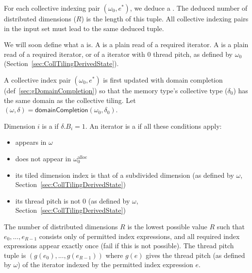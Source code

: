
For each collective indexing pair $(\omega_0, e^*)$, we deduce a .
The deduced number of distributed dimensions ($R$) is the length of this tuple.
All collective indexing pairs in the input set must lead to the same deduced tuple.

We will soon define what a  is.
A  is a plain read of a required iterator.
A  is a plain read of a required iterator, or of a  iterator with 0 thread pitch, as defined by $\omega_0$ (Section~\ref{sec:CollTilingDerivedState}).

A collective index pair $(\omega_0, e^*)$ is first updated with domain completion (def~\ref{sec:gDomainCompletion}) so that the memory type's collective type ($\delta_0$) has the same domain as the collective tiling.
Let $(\omega, \delta) = \mathsf{domainCompletion}(\omega_0, \delta_0)$.

Dimension $i$ is a  if $\delta.B_i = 1$.
An iterator is a  if all these conditions apply:
\begin{itemize}
  \item appears in $\omega$
  \item does not appear in $\omega_0^\text{alloc}$
  \item its tiled dimension index is that of a subdivided dimension (as defined by $\omega$, Section~\ref{sec:CollTilingDerivedState})
  \item its thread pitch is not 0 (as defined by $\omega$, Section~\ref{sec:CollTilingDerivedState})
\end{itemize}
The number of distributed dimensions $R$ is the lowest possible value $R$ such that $e_0, ..., e_{R-1}$ consists only of permitted index expressions, and all required index expressions appear exactly once (fail if this is not possible).
The thread pitch tuple is $(g(e_0), ..., g(e_{R-1}))$ where $g(e)$ gives the thread pitch (as defined by $\omega$) of the iterator indexed by the permitted index expression $e$.
